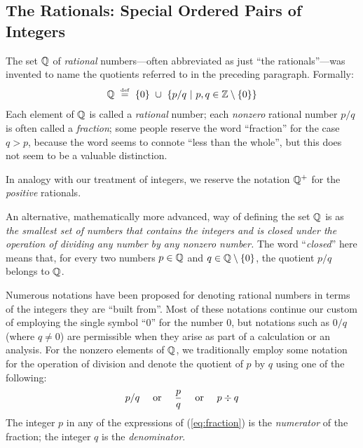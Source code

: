 \subsection{The Rationals: Special Ordered Pairs of Integers}
\label{sec:define-rationals}

 
 
The set $\mathbb{Q}$ of {\it rational} numbers---often abbreviated as just ``the rationals''---was invented to name the quotients referred to in the preceding paragraph.  Formally:
\[ \mathbb{Q} \ \stackrel{\mbox{{\tiny def}}}{=} \ \{0\} \ \cup \ \left\{ p/q \ | \ p, q \in \mathbb{Z}
\setminus \{0\} \right\}
\]
Each element of $\mathbb{Q}$ is called a {\it rational} number; each {\em nonzero} rational number $p/q$ is often called a {\em fraction}; some people reserve the word ``fraction'' for the case $q > p$, because the word seems to connote ``less than the whole'', but this does not seem to be a valuable distinction.

\smallskip

In analogy with our treatment of integers, we reserve the notation $\mathbb{Q}^+$ for the {\em positive} rationals.

\smallskip


An alternative, mathematically more advanced, way of defining the set $\mathbb{Q}$ is as {\em the smallest set of numbers that contains the integers and is closed under the operation of dividing any number by any nonzero number.}  The word ``{\it closed}'' here means that, for every two numbers $p \in \mathbb{Q}$ and $q \in \mathbb{Q} \setminus \{0\}$, the quotient $p/q$ belongs to $\mathbb{Q}$.

\smallskip

Numerous notations have been proposed for denoting rational numbers in terms of the integers they are ``built from''.  Most of these notations continue our custom of employing the single symbol ``$0$'' for the number $0$, but notations such as $0/q$ (where $q \neq 0$) are permissible when they arise as part of a calculation or an analysis.  For the nonzero elements of $\mathbb{Q}$, we traditionally employ some notation for the operation of division and denote the quotient of $p$ by $q$ using one of the following:
\begin{equation}
\label{eq:fraction}
 p/q \ \ \ \mbox{ or } \ \ \ {p \over q} \ \ \ \mbox{ or } \ \ \ p
 \div q
\end{equation}
The integer $p$ in any of the expressions of (\ref{eq:fraction}) is the {\it numerator} of the fraction; the integer $q$ is the {\it denominator}.
 
 

